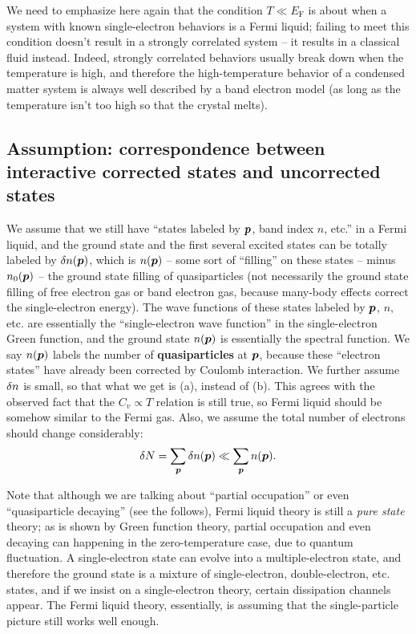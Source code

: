\documentclass[hyperref, a4paper]{article}
\newcommand*{\concept}[1]{{\textbf{#1}}}
\newcommand*{\efermi}{E_{\text{F}}}
\begin{document}
We need to emphasize here again 
that the condition $T \ll \efermi$
is about when a system with known single-electron behaviors 
is a Fermi liquid;
failing to meet this condition 
doesn't result in a strongly correlated system -- 
it results in a classical fluid instead.
Indeed, strongly correlated behaviors usually break down 
when the temperature is high, 
and therefore the high-temperature behavior 
of a condensed matter system 
is always well described by a band electron model 
(as long as the temperature isn't too high 
so that the crystal melts).

\subsection{Assumption: correspondence between interactive corrected states and uncorrected states}\label{sec:fermi-liquid.assumption-1}

We assume that we still have ``states labeled by $\vb*{p}$, band index $n$, etc.'' 
in a Fermi liquid,
and the ground state and the first several excited states 
can be totally labeled by $\var{n(\vb*{p})}$,
which is $n(\vb*{p})$ -- some sort of ``filling'' on these states -- 
minus $n_0(\vb*{p})$ -- the ground state filling of quasiparticles
(not necessarily the ground state filling of 
free electron gas or band electron gas, 
because many-body effects correct the single-electron energy). 
The wave functions of  these states labeled by $\vb*{p}$, $n$, etc. 
are essentially the ``single-electron wave function''
in the single-electron Green function, 
and the ground state $n(\vb*{p})$ is essentially the spectral function.
We say $n(\vb*{p})$ labels the number of \concept{quasiparticles} at $\vb*{p}$,
because these ``electron states'' have already been corrected by Coulomb interaction.
We further assume $\var{n}$ is small, so that what we get is (a),
instead of (b).
This agrees with the observed fact that the $C_v \propto T$ relation is still true,
so Fermi liquid should be somehow similar to the Fermi gas. 
Also, we assume the total number of electrons 
should change considerably:
\begin{equation}
    \var{N} = \sum_{\vb*{p}} \var{n(\vb*{p})} \ll \sum_{\vb*{p}} n(\vb*{p}). 
\end{equation}

Note that although we are talking about ``partial occupation''
or even ``quasiparticle decaying'' (see the follows), 
Fermi liquid theory is still a \emph{pure state} theory; 
as is shown by Green function theory, 
partial occupation and even decaying can happening 
in the zero-temperature case, 
due to quantum fluctuation.
A single-electron state can evolve into a multiple-electron state, 
and therefore the ground state is a mixture of single-electron, double-electron, etc. states, 
and if we insist on a single-electron theory,
certain dissipation channels appear.
The Fermi liquid theory, essentially, 
is assuming that the single-particle picture still works well enough.
\end{document}
